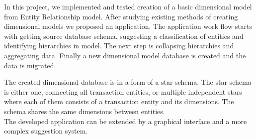 In this project, we implemented and tested creation of a basic dimensional model from Entity Relationship model. After studying existing methods of creating dimensional models we proposed an application. The application work flow starts with getting source database schema, suggesting a classification of entities and identifying hierarchies in model. The next step is collapsing hierarchies and aggregating data. Finally a new dimensional model database is created and the data is migrated.\par
The created dimensional database is in a form of a star schema. The star schema is either one, connecting all transaction entities, or multiple independent stars where each of them consists of a transaction entity and its dimensions. The schema shares the same dimensions between entities.\\
	The developed application can be extended by a graphical interface and a more complex suggestion system. 
